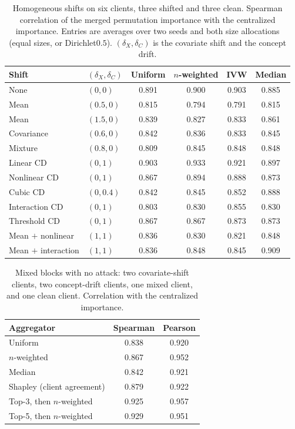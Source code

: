 \begin{table}[t]
\centering
\caption{Homogeneous shifts on six clients, three shifted and three clean.
Spearman correlation of the merged permutation importance with the
centralized importance.
Entries are averages over two seeds and both size allocations
(equal sizes, or Dirichlet\(0.5\)).
\((\delta_X,\delta_C)\) is the covariate shift and the concept drift.}
\label{tab:fed-vimp-homo}
\small
\begin{tabular}{llcccc}
\toprule
Shift & \((\delta_X,\delta_C)\) & Uniform & \(n\)-weighted & IVW & Median \\
\midrule
None & \((0,0)\) & 0.891 & 0.900 & 0.903 & 0.885 \\
Mean & \((0.5,0)\) & 0.815 & 0.794 & 0.791 & 0.815 \\
Mean & \((1.5,0)\) & 0.839 & 0.827 & 0.833 & 0.861 \\
Covariance & \((0.6,0)\) & 0.842 & 0.836 & 0.833 & 0.845 \\
Mixture & \((0.8,0)\) & 0.809 & 0.845 & 0.848 & 0.848 \\
Linear CD & \((0,1)\) & 0.903 & 0.933 & 0.921 & 0.897 \\
Nonlinear CD & \((0,1)\) & 0.867 & 0.894 & 0.888 & 0.873 \\
Cubic CD & \((0,0.4)\) & 0.842 & 0.845 & 0.852 & 0.888 \\
Interaction CD & \((0,1)\) & 0.803 & 0.830 & 0.855 & 0.830 \\
Threshold CD & \((0,1)\) & 0.867 & 0.867 & 0.873 & 0.873 \\
Mean \(+\) nonlinear & \((1,1)\) & 0.836 & 0.830 & 0.821 & 0.848 \\
Mean \(+\) interaction & \((1,1)\) & 0.836 & 0.848 & 0.845 & 0.909 \\
\bottomrule
\end{tabular}
\end{table}

\begin{table}[t]
\centering
\caption{Mixed blocks with no attack: two covariate-shift clients, two
concept-drift clients, one mixed client, and one clean client.
Correlation with the centralized importance.}
\label{tab:fed-vimp-mixed}
\small
\begin{tabular}{lcc}
\toprule
Aggregator & Spearman & Pearson \\
\midrule
Uniform & 0.838 & 0.920 \\
\(n\)-weighted & 0.867 & 0.952 \\
Median & 0.842 & 0.921 \\
Shapley (client agreement) & 0.879 & 0.922 \\
Top-3, then \(n\)-weighted & 0.925 & 0.957 \\
Top-5, then \(n\)-weighted & 0.929 & 0.951 \\
\bottomrule
\end{tabular}
\end{table}

